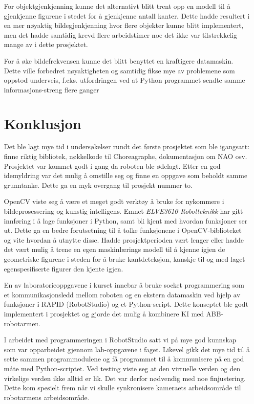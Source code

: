 \documentclass[conference]{IEEEtran}
\begin{document}
        For objektgjenkjenning kunne det alternativt blitt trent opp en modell til å gjenkjenne figurene i stedet for å gjenkjenne antall kanter. Dette hadde resultert i en mer nøyaktig bildegjenkjenning hvor flere objekter kunne blitt implementert, men det hadde samtidig krevd flere arbeidstimer noe det ikke var tilstrekkelig mange av i dette prosjektet.  

        For å øke bildefrekvensen kunne det blitt benyttet en kraftigere datamaskin. Dette ville forbedret nøyaktigheten og samtidig fikse mye av problemene som oppstod underveis, f.eks. utfordringen ved at Python programmet sendte samme informasjons-streng flere ganger

    
\section{Konklusjon}
    Det ble lagt mye tid i undersøkelser rundt det første prosjektet som ble igangsatt: finne riktig bibliotek, nøkkelkode til Choreagraphe, dokumentasjon om NAO osv. Prosjektet var kommet godt i gang da roboten ble ødelagt. Etter en god idemyldring var det mulig å omstille seg og finne en oppgave som beholdt samme grunntanke. Dette ga en myk overgang til prosjekt nummer to.

    OpenCV viste seg å være et meget godt verktøy å bruke for nykommere i bildeprosessering og kunstig intelligens. Emnet \textit{ELVE3610 Robotteknikk} har gitt innføring i å lage funksjoner i Python, samt bli kjent med hvordan funksjoner ser ut. Dette ga en bedre forutsetning til å tolke funksjonene i OpenCV-biblioteket og vite hvordan å utnytte disse. Hadde prosjektperioden vært lenger eller  hadde det vært mulig å trene en egen maskinlærings modell til å kjenne igjen de geometriske figurene i steden for å bruke kantdeteksjon, kanskje til og med laget egenspesifiserte figurer den kjente igjen. 

    En av laboratorieoppgavene i kurset innebar å bruke socket programmering som et kommunikasjonsledd mellom roboten og en ekstern datamaskin ved hjelp av funksjoner i RAPID (RobotStudio) og et Python-script. Dette konseptet ble godt implementert i prosjektet og gjorde det mulig å kombinere KI med ABB-robotarmen. 

    I arbeidet med programmeringen i RobotStudio satt vi på mye god kunnskap som var opparbeidet gjennom lab-oppgavene i faget. Likevel gikk det mye tid til å sette sammen programmodulene og få programmet til å kommunisere på en god måte med Python-scriptet. Ved testing viste seg at den virtuelle verden og den virkelige verden ikke alltid er lik. Det var derfor nødvendig med noe finjustering. Dette kom spesielt frem når vi skulle synkronisere kameraets arbeidsområde til robotarmens arbeidsområde. 
\end{document}
